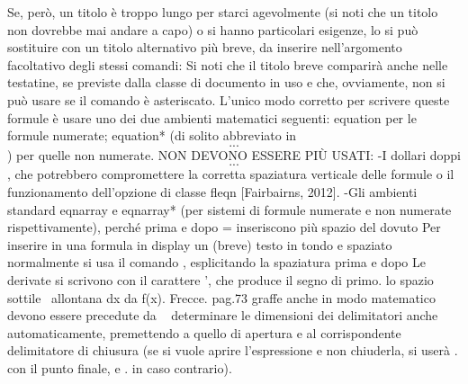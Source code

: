 %
Se, però, un titolo è troppo lungo per starci agevolmente (si noti che un titolo non dovrebbe mai andare a capo) o si hanno particolari esigenze, lo si può sostituire con un titolo alternativo più breve, da inserire nell’argomento facoltativo degli stessi comandi:
Si noti che il titolo breve comparirà anche nelle testatine, se previste dalla classe di documento in uso e che, ovviamente, non si può usare se il comando è asteriscato.
%
%
\omissis
%
%
L’unico modo corretto per scrivere queste formule è usare uno dei due ambienti matematici seguenti:
equation per le formule numerate;
equation* (di solito abbreviato in \[. . .\]) per quelle non numerate.
NON DEVONO ESSERE PIÙ USATI:
-I dollari doppi $$. . .$$, che potrebbero compromettere la corretta spaziatura verticale delle formule o il funzionamento dell’opzione di classe fleqn [Fairbairns, 2012].
-Gli ambienti standard eqnarray e eqnarray* (per sistemi di formule numerate e non numerate rispettivamente), perché prima e dopo = inseriscono più spazio del dovuto
Per inserire in una formula in display un (breve) testo in tondo e spaziato normalmente si usa il comando \text, esplicitando la spaziatura prima e dopo
Le derivate si scrivono con il carattere ’, che produce il segno di primo.
lo spazio sottile \, allontana dx da f(x).
Frecce. pag.73
graffe anche in modo matematico devono essere precedute da \ 
determinare le dimensioni dei delimitatori anche automaticamente, premettendo \left a quello di apertura e \right al corrispondente delimitatore di chiusura (se si vuole aprire l’espressione e non chiuderla, si userà \left. con il punto finale, e \right. in caso contrario).
